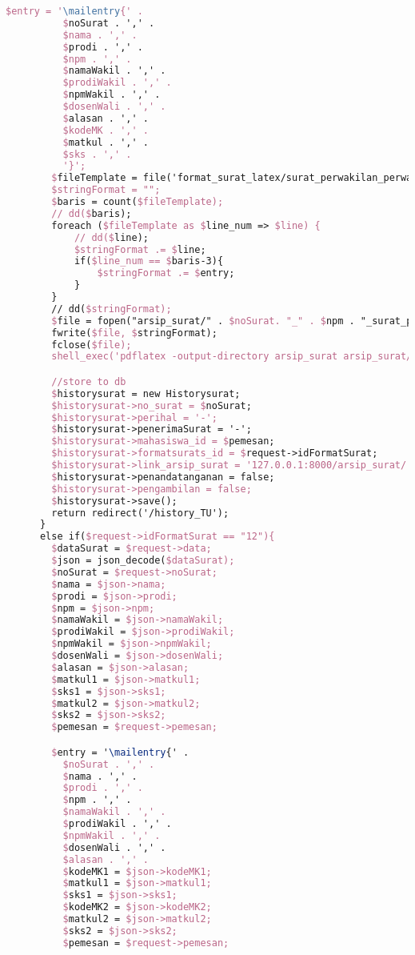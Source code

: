 \begin{lstlisting}[language=tex,basicstyle=\tiny,caption=HistorysuratController.php]
        $entry = '\mailentry{' .
          $noSurat . ',' .
          $nama . ',' .
          $prodi . ',' .
          $npm . ',' .
          $namaWakil . ',' .
          $prodiWakil . ',' .
          $npmWakil . ',' .
          $dosenWali . ',' .
          $alasan . ',' .
          $kodeMK . ',' .
          $matkul . ',' .
          $sks . ',' .
          '}';
        $fileTemplate = file('format_surat_latex/surat_perwakilan_perwalian_1mk.tex');
        $stringFormat = "";
        $baris = count($fileTemplate);
        // dd($baris);
        foreach ($fileTemplate as $line_num => $line) {
            // dd($line);
            $stringFormat .= $line;
            if($line_num == $baris-3){
                $stringFormat .= $entry;
            }
        }
        // dd($stringFormat);
        $file = fopen("arsip_surat/" . $noSurat. "_" . $npm . "_surat_perwakilan_perwalian_1mk.tex", "w");
        fwrite($file, $stringFormat);
        fclose($file);
        shell_exec('pdflatex -output-directory arsip_surat arsip_surat/' . $noSurat . '_' . $npm . '_surat_perwakilan_perwalian_1mk.tex');

        //store to db
        $historysurat = new Historysurat;
        $historysurat->no_surat = $noSurat;
        $historysurat->perihal = '-';
        $historysurat->penerimaSurat = '-';
        $historysurat->mahasiswa_id = $pemesan;
        $historysurat->formatsurats_id = $request->idFormatSurat;
        $historysurat->link_arsip_surat = '127.0.0.1:8000/arsip_surat/' . $noSurat. '_' . $npm . '_surat_perwakilan_perwalian_1mk.pdf';
        $historysurat->penandatanganan = false;
        $historysurat->pengambilan = false;
        $historysurat->save();
        return redirect('/history_TU');
      }
      else if($request->idFormatSurat == "12"){
        $dataSurat = $request->data;
        $json = json_decode($dataSurat);
        $noSurat = $request->noSurat;
        $nama = $json->nama;
        $prodi = $json->prodi;
        $npm = $json->npm;
        $namaWakil = $json->namaWakil;
        $prodiWakil = $json->prodiWakil;
        $npmWakil = $json->npmWakil;
        $dosenWali = $json->dosenWali;
        $alasan = $json->alasan;
        $matkul1 = $json->matkul1;
        $sks1 = $json->sks1;
        $matkul2 = $json->matkul2;
        $sks2 = $json->sks2;
        $pemesan = $request->pemesan;

        $entry = '\mailentry{' .
          $noSurat . ',' .
          $nama . ',' .
          $prodi . ',' .
          $npm . ',' .
          $namaWakil . ',' .
          $prodiWakil . ',' .
          $npmWakil . ',' .
          $dosenWali . ',' .
          $alasan . ',' .
          $kodeMK1 = $json->kodeMK1;
          $matkul1 = $json->matkul1;
          $sks1 = $json->sks1;
          $kodeMK2 = $json->kodeMK2;
          $matkul2 = $json->matkul2;
          $sks2 = $json->sks2;
          $pemesan = $request->pemesan;


\end{lstlisting}
